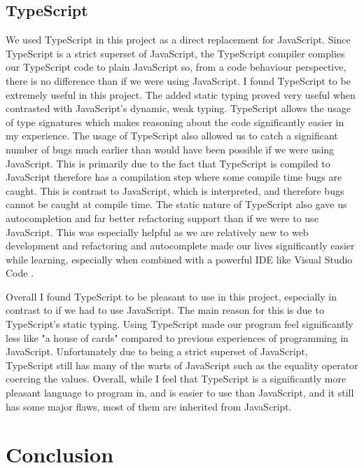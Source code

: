 \documentclass[10pt, journal]{IEEEtran}
\begin{document}
\subsection{TypeScript}
We used TypeScript \cite{ts} in this project as a direct replacement for JavaScript. Since TypeScript is a strict superset of JavaScript, the TypeScript compiler complies our TypeScript code to plain JavaScript so, from a code behaviour perspective, there is no difference than if we were using JavaScript. I found TypeScript to be extremely useful in this project. The added static typing proved very useful when contrasted with JavaScript's dynamic, weak typing. TypeScript allows the usage of type signatures which makes reasoning about the code significantly easier in my experience. The usage of TypeScript also allowed us to catch a significant number of bugs much earlier than would have been possible if we were using JavaScript. This is primarily due to the fact that TypeScript is compiled to JavaScript therefore has a compilation step where some compile time bugs are caught. This is contrast to JavaScript, which is interpreted, and therefore bugs cannot be caught at compile time. The static nature of TypeScript also gave us autocompletion and far better refactoring support than if we were to use JavaScript. This was especially helpful as we are relatively new to web development and refactoring and autocomplete made our lives significantly easier while learning, especially when combined with a powerful IDE like Visual Studio Code \cite{vscode}.

Overall I found TypeScript to be pleasant to use in this project, especially in contrast to if we had to use JavaScript. The main reason for this is due to TypeScript's static typing. Using TypeScript made our program feel significantly less like "a house of cards" compared to previous experiences of programming in JavaScript. Unfortunately due to being a strict superset of JavaScript, TypeScript still has many of the warts of JavaScript such as the equality operator coercing the values. Overall, while I feel that TypeScript is a significantly more pleasant language to program in, and is easier to use than JavaScript, and it still has some major flaws, most of them are inherited from JavaScript.

\section{Conclusion}




\end{document}
